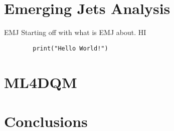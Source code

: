 \documentclass[8pt,aspectratio=169]{beamer}
\begin{document}
\section{Emerging Jets Analysis}

\begin{frame}[fragile]{EMJ}
	Starting off with what is EMJ about.
	HI
	\begin{verbatim}
        print("Hello World!")
    \end{verbatim}
\end{frame}

\section{ML4DQM}


\section{Conclusions}
\end{document}
